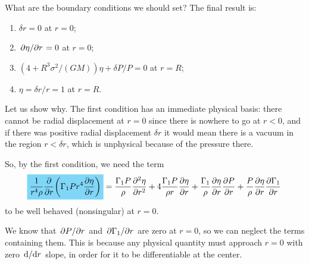 \documentclass[main.tex]{subfiles}
\begin{document}
What are the boundary conditions we should set? The final result is:
%
\begin{enumerate}
    \item \(\delta r = 0\) at \(r = 0\);
    \item \(\pdv*{\eta}{r} = 0 \) at \(r=0\);
    \item \((4 + R^3 \sigma^2 / (GM)) \eta + \delta P / P = 0\) at \(r =R\);
    \item \(\eta = \delta r / r = 1\) at \(r = R\).
\end{enumerate}

Let us show why. The first condition has an immediate physical basis: there cannot be radial displacement at \(r=0\) since there is nowhere to go at \(r<0\), and if there was positive radial displacement \(\delta r\) it would mean there is a vacuum in the region \(r<\delta r \), which is unphysical because of the pressure there.

So, by the first condition, we need the term 
%
\begin{align}
\hlc{cyan}{\frac{1}{r^4 \rho } \pdv{}{r} \qty(\Gamma_1 P r^{4} \pdv{\eta }{r})}
= \frac{\Gamma_1 P}{\rho } \pdv[2]{\eta }{r}
+ 4 \frac{\Gamma_1 P}{\rho r} \pdv{\eta}{r} 
+ \frac{\Gamma_1 }{\rho } \pdv{\eta }{r} \pdv{P}{r}
+ \frac{P}{\rho } \pdv{\eta }{r} \pdv{\Gamma_1}{r}
\,
\end{align}
%
to be well behaved (nonsingular) at \(r=0\). 

We know that \(\pdv*{P}{r}\) and \(\pdv*{\Gamma_1}{r}\) are zero at \(r=0\), so we can neglect the terms containing them. This is because any physical quantity must approach \(r=0\) with zero \(\dv*{}{r}\) slope, in order for it to be differentiable at the center.


\end{document}
